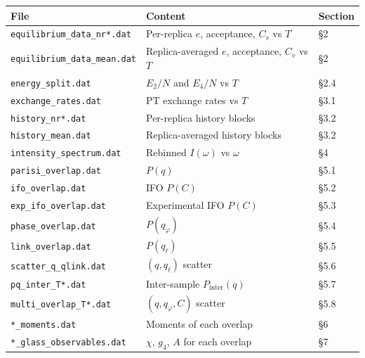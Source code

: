 \documentclass[11pt,a4paper]{article}
\begin{document}
\begin{table}[h!]
\centering\small
\begin{tabular}{@{}lll@{}}
\toprule
\textbf{File} & \textbf{Content} & \textbf{Section} \\
\midrule
\texttt{equilibrium\_data\_nr*.dat}     & Per-replica $e$, acceptance, $C_v$ vs $T$       & \S2 \\
\texttt{equilibrium\_data\_mean.dat}    & Replica-averaged $e$, acceptance, $C_v$ vs $T$  & \S2 \\
\texttt{energy\_split.dat}              & $E_2/N$ and $E_4/N$ vs $T$                      & \S2.4 \\
\texttt{exchange\_rates.dat}            & PT exchange rates vs $T$                        & \S3.1 \\
\texttt{history\_nr*.dat}               & Per-replica history blocks                      & \S3.2 \\
\texttt{history\_mean.dat}              & Replica-averaged history blocks                 & \S3.2 \\
\texttt{intensity\_spectrum.dat}        & Rebinned $I(\omega)$ vs $\omega$                & \S4 \\
\texttt{parisi\_overlap.dat}            & $P(q)$                                          & \S5.1 \\
\texttt{ifo\_overlap.dat}              & IFO $P(C)$                                      & \S5.2 \\
\texttt{exp\_ifo\_overlap.dat}         & Experimental IFO $P(C)$                         & \S5.3 \\
\texttt{phase\_overlap.dat}            & $P(q_\varphi)$                                  & \S5.4 \\
\texttt{link\_overlap.dat}             & $P(q_\ell)$                                     & \S5.5 \\
\texttt{scatter\_q\_qlink.dat}          & $(q, q_\ell)$ scatter                           & \S5.6 \\
\texttt{pq\_inter\_T*.dat}             & Inter-sample $P_{\mathrm{inter}}(q)$             & \S5.7 \\
\texttt{multi\_overlap\_T*.dat}         & $(q, q_\varphi, C)$ scatter                     & \S5.8 \\
\texttt{*\_moments.dat}                & Moments of each overlap                          & \S6 \\
\texttt{*\_glass\_observables.dat}     & $\chi$, $g_4$, $A$ for each overlap              & \S7 \\

\end{tabular}
\end{table}
\end{document}
